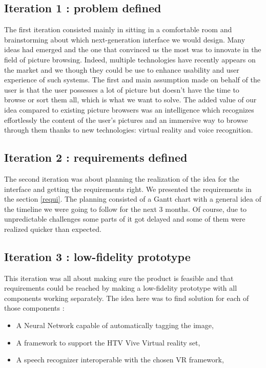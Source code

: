 \documentclass[11pt,a4paper]{article}
\begin{document}
\subsection{Iteration 1 : problem defined}

The first iteration consisted mainly in sitting in a comfortable room and brainstorming about which next-generation interface we would design. Many ideas had emerged and the one that convinced us the most was to innovate in the field of picture browsing. Indeed, multiple technologies have recently appears on the market and we though they could be use to enhance usability and user experience of such systems.
The first and main assumption made on behalf of the user is that the user possesses a lot of picture but doesn't have the time to browse or sort them all, which is what we want to solve.
The added value of our idea compared to existing picture browsers was an intelligence which recognizes effortlessly the content of the user's pictures and an immersive way to browse through them thanks to new technologies: virtual reality and voice recognition.

\subsection{Iteration 2 : requirements defined}

The second iteration was about planning the realization of the idea for the interface and getting the requirements right. We presented the requirements in the section \ref{requi}. The planning consisted of a Gantt chart with a general idea of the timeline we were going to follow for the next 3 months. Of course, due to unpredictable challenges some parts of it got delayed and some of them were realized quicker than expected.

\subsection{Iteration 3 : low-fidelity prototype}

This iteration was all about making sure the product is feasible and that requirements could be reached by making a low-fidelity prototype with all components working separately.
The idea here was to find solution for each of those components :
\begin{itemize}
	\item A Neural Network capable of automatically tagging the image,
	\item A framework to support the HTV Vive Virtual reality set,
	\item A speech recognizer interoperable with the chosen VR framework,
\end{itemize}
\end{document}
